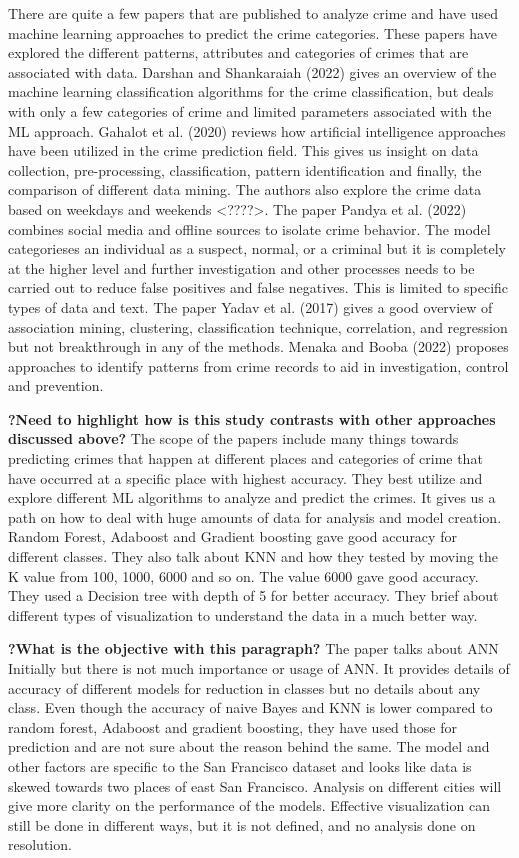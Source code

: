 \documentclass[conference,final,]{IEEEtran}
\begin{document}
There are quite a few papers that are published to analyze crime and
have used machine learning approaches to predict the crime categories.
These papers have explored the different patterns, attributes and
categories of crimes that are associated with data. Darshan and
Shankaraiah (2022) gives an overview of the machine learning
classification algorithms for the crime classification, but deals with
only a few categories of crime and limited parameters associated with
the ML approach. Gahalot et al. (2020) reviews how artificial
intelligence approaches have been utilized in the crime prediction
field. This gives us insight on data collection, pre-processing,
classification, pattern identification and finally, the comparison of
different data mining. The authors also explore the crime data based on
weekdays and weekends \textless????\textgreater. The paper Pandya et al.
(2022) combines social media and offline sources to isolate crime
behavior. The model categorieses an individual as a suspect, normal, or
a criminal but it is completely at the higher level and further
investigation and other processes needs to be carried out to reduce
false positives and false negatives. This is limited to specific types
of data and text. The paper Yadav et al. (2017) gives a good overview of
association mining, clustering, classification technique, correlation,
and regression but not breakthrough in any of the methods. Menaka and
Booba (2022) proposes approaches to identify patterns from crime records
to aid in investigation, control and prevention.

\textbf{?Need to highlight how is this study contrasts with other
approaches discussed above?} The scope of the papers include many things
towards predicting crimes that happen at different places and categories
of crime that have occurred at a specific place with highest accuracy.
They best utilize and explore different ML algorithms to analyze and
predict the crimes. It gives us a path on how to deal with huge amounts
of data for analysis and model creation. Random Forest, Adaboost and
Gradient boosting gave good accuracy for different classes. They also
talk about KNN and how they tested by moving the K value from 100, 1000,
6000 and so on. The value 6000 gave good accuracy. They used a Decision
tree with depth of 5 for better accuracy. They brief about different
types of visualization to understand the data in a much better way.

\textbf{?What is the objective with this paragraph?} The paper talks
about ANN Initially but there is not much importance or usage of ANN. It
provides details of accuracy of different models for reduction in
classes but no details about any class. Even though the accuracy of
naive Bayes and KNN is lower compared to random forest, Adaboost and
gradient boosting, they have used those for prediction and are not sure
about the reason behind the same. The model and other factors are
specific to the San Francisco dataset and looks like data is skewed
towards two places of east San Francisco. Analysis on different cities
will give more clarity on the performance of the models. Effective
visualization can still be done in different ways, but it is not
defined, and no analysis done on resolution.
\end{document}
